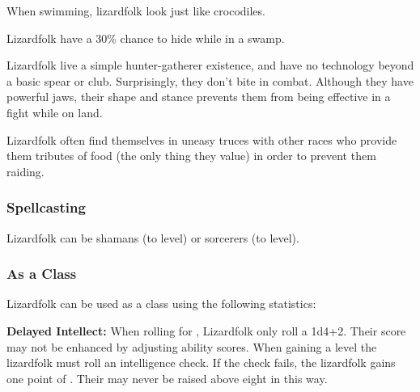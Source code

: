\begin{multicols*}{2}
When swimming, lizardfolk look just like crocodiles.

Lizardfolk have a 30\% chance to hide while in a swamp.

Lizardfolk live a simple hunter-gatherer existence, and have no technology beyond a basic spear or club. Surprisingly, they don’t bite in combat. Although they have powerful jaws, their shape and stance prevents them from being effective in a fight while on land.

Lizardfolk often find themselves in uneasy truces with other races who provide them tributes of food (the only thing they value) in order to prevent them raiding.

\subsubsection{Spellcasting}
Lizardfolk can be shamans (to  level) or sorcerers (to  level).

\subsubsection{As a Class}
Lizardfolk can be used as a class using the following statistics:

\textbf{Delayed Intellect:} When rolling for , Lizardfolk only roll a 1d4+2. Their  score may not be enhanced by adjusting ability scores. When gaining a level the lizardfolk must roll an intelligence check. If the check fails, the lizardfolk gains one point of . Their  may never be raised above eight in this way.



\end{multicols*}
